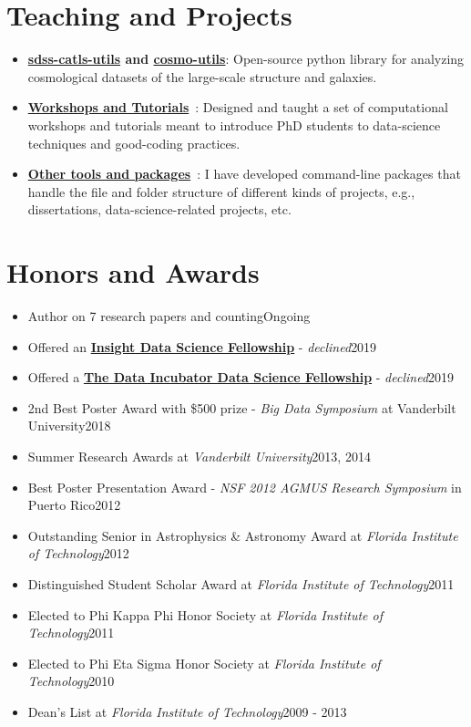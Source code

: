 \documentclass[letterpaper,11pt]{article}
\newcommand{\resumeItem}[2]{
  \item\small{
    \textbf{#1}{: #2 \vspace{-2pt}}
  }
}
\newcommand{\resumeItemThree}[3]{
  \item\small{
    \textbf{#1}\ {#2}{: #3 \vspace{-2pt}}
  }
}
\newcommand{\resumeSubheadingnew}[2]{
  \vspace{-2pt}\item{#1}\hfill{#2}\\[0pt]
  }
\newcommand{\resumeSubItem}[2]{\resumeItem{#1}{#2}\vspace{-4pt}}
\newcommand{\resumeSubItemThree}[3]{\resumeItemThree{#1}{#2}{#3}\vspace{-4pt}}
\newcommand{\resumeSubHeadingListStart}{\begin{itemize}[leftmargin=*]}
\newcommand{\resumeSubHeadingListEnd}{\end{itemize}}
\begin{document}
\section{Teaching and Projects}
  \resumeSubHeadingListStart
    \resumeSubItem{\href{https://sdss-catls-utils.readthedocs.io/en/latest/}{sdss-catls-utils} and \href{https://cosmo-utils.readthedocs.io/en/latest/}{cosmo-utils}}
      {Open-source python library for analyzing cosmological datasets of
      the large-scale structure and galaxies.}
  \resumeSubHeadingListEnd
  \resumeSubHeadingListStart
    \resumeSubItemThree
      {\href{https://vandyastroml.github.io/}{Workshops and Tutorials}}
      {\href{https://vandyastroml.github.io/}{\faGlobe}}
      {Designed and taught a set of computational workshops and tutorials
      meant to introduce PhD students to data-science techniques and
      good-coding practices.}
  \resumeSubHeadingListEnd
  \resumeSubHeadingListStart
    \resumeSubItemThree
      {\href{https://vcalderon2009.github.io/vc_tools.html}{Other tools and packages}}
      {\href{https://vcalderon2009.github.io/vc_tools.html}{\faGlobe}}
      {I have developed command-line packages that handle the file and folder structure of different
      kinds of projects, e.g., dissertations, data-science-related projects, etc.}
  \resumeSubHeadingListEnd

\section{Honors and Awards}
  \resumeSubHeadingListStart
    \resumeSubheadingnew
      {Author on 7 research papers and counting}{Ongoing}
    \resumeSubheadingnew
      {Offered an \href{https://www.insightdatascience.com/}{\textbf{Insight Data Science Fellowship}}  - \textit{declined}}{2019}
    \resumeSubheadingnew
      {Offered a \href{https://www.thedataincubator.com/}{\textbf{The Data Incubator Data Science Fellowship}} - \textit{declined}}{2019}
    \resumeSubheadingnew
      {2nd Best Poster Award with \$500 prize - \textit{Big Data Symposium} at Vanderbilt University}{2018}
    \resumeSubheadingnew
      {Summer Research Awards at \textit{Vanderbilt University}}{2013, 2014}
    \resumeSubheadingnew
      {Best Poster Presentation Award - \textit{NSF 2012 AGMUS Research Symposium} in Puerto Rico}{2012}
    \resumeSubheadingnew
      {Outstanding Senior in Astrophysics \& Astronomy Award at \textit{Florida Institute of Technology}}{2012}
    \resumeSubheadingnew
      {Distinguished Student Scholar Award at \textit{Florida Institute of Technology}}{2011}
    \resumeSubheadingnew
      {Elected to Phi Kappa Phi Honor Society at \textit{Florida Institute of Technology}}{2011}
    \resumeSubheadingnew
      {Elected to Phi Eta Sigma Honor Society at \textit{Florida Institute of Technology}}{2010}
    \resumeSubheadingnew
      {Dean's List at \textit{Florida Institute of Technology}}{2009 - 2013}
  \resumeSubHeadingListEnd
\end{document}
